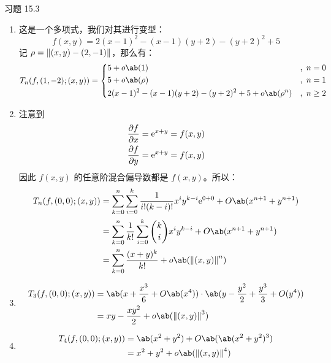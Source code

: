 \begin{problem}
    习题 15.3
    \begin{solution}
        \begin{enumerate}
            \item[\textbf{1)}] 这是一个多项式，我们对其进行变型：
            $$
            f(x, y) = 2(x - 1)^2 - (x - 1)(y + 2) - (y + 2)^2 + 5
            $$
            记 $\rho = \norm{(x, y) - (2, -1)}$，那么有：
            $$
            T_n(f, (1, -2); (x, y)) = \begin{dcases}
                5 + o\ab(1) &,\ n = 0 \\
                5 + o\ab(\rho) &,\ n = 1 \\
                2(x - 1)^2 - (x - 1)(y + 2) - (y + 2)^2 + 5 + o\ab(\rho^{n}) &,\ n \ge 2
            \end{dcases}
            $$

            \item[\textbf{2)}] 注意到
            $$
            \begin{gathered}
                \pdv{f}{x} = \mathrm{e}^{x + y} = f(x, y) \\
                \pdv{f}{y} = \mathrm{e}^{x + y} = f(x, y)
            \end{gathered}
            $$
            因此 $f(x, y)$ 的任意阶混合偏导数都是 $f(x, y)$。所以：
            $$
            \begin{aligned}
                T_n(f, (0, 0); (x, y)) & = \sum_{k = 0}^{n} \sum_{i = 0}^{k} \frac{1}{i! (k - i)!} x^i y^{k - i} \E^{0 + 0} + O\ab(x^{n + 1} + y^{n + 1})\\
                & = \sum_{k = 0}^{n} \frac{1}{k!} \sum_{i = 0}^{k} \binom{k}{i} x^i y^{k - i} + O\ab(x^{n + 1} + y^{n + 1})\\
                & = \sum_{k = 0}^{n} \frac{(x + y)^{k}}{k!} + o\ab(\norm{(x, y)}^{n})
            \end{aligned}
            $$

            \item[\textbf{3)}]
            $$
            \begin{aligned}
                T_3(f, (0, 0); (x, y)) & = \ab(x + \frac{x^3}{6} + O\ab(x^{4})) \cdot \ab(y - \frac{y^2}{2} + \frac{y^3}{3} + O(y^{4})) \\
                & = x y - \frac{x y^2}{2} + o\ab(\norm{(x, y)}^{3})
            \end{aligned}
            $$

            \item[\textbf{4)}]
            $$
            \begin{aligned}
                T_4(f, (0, 0); (x, y)) & = \ab(x^2 + y^2) + O\ab(\ab(x^2 + y^2)^3) \\
                & = x^2 + y^2 + o\ab(\norm{(x, y)}^{4})
            \end{aligned}
            $$
        \end{enumerate}
    \end{solution}
\end{problem}